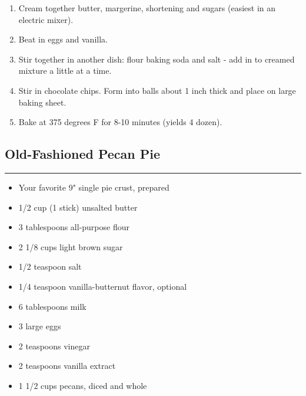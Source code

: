 \documentclass{article}
\begin{document}
\begin{enumerate}
    \item 
        Cream together butter, margerine, shortening and sugars (easiest in an electric mixer).
    \item 
        Beat in eggs and vanilla.
    \item 
        Stir together in another dish: flour baking soda and salt - add in to creamed mixture a little at a time.
    \item 
        Stir in chocolate chips. Form into balls about 1 inch thick and place on large baking sheet.
    \item 
        Bake at 375 degrees F for 8-10 minutes (yields 4 dozen).
\end{enumerate}
\newpage

\subsection{Old-Fashioned Pecan Pie} 
\noindent\rule[0.5ex]{\linewidth}{1pt}

\begin{framed}
\begin{itemize}
    \item Your favorite 9" single pie crust, prepared
    \item 1/2 cup (1 stick) unsalted butter
    \item 3 tablespoons all-purpose flour
    \item 2 1/8 cups light brown sugar
    \item 1/2 teaspoon salt
    \item 1/4 teaspoon vanilla-butternut flavor, optional
    \item 6 tablespoons milk
    \item 3 large eggs
    \item 2 teaspoons vinegar
    \item 2 teaspoons vanilla extract
    \item 1 1/2 cups pecans, diced and whole
\end{itemize}
\end{framed}
\end{document}
